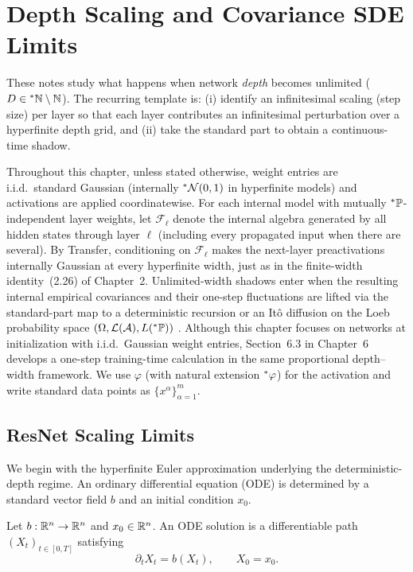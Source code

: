 \chapter{Depth Scaling and Covariance SDE Limits}\label{ch:depth}

These notes study what happens when network \emph{depth} becomes unlimited ($D \in {}^*\mathbb{N} \setminus \mathbb{N}$). The recurring template is: (i) identify an infinitesimal scaling (step size) per layer so that each layer contributes an infinitesimal perturbation over a hyperfinite depth grid, and (ii) take the standard part to obtain a continuous-time shadow.

Throughout this chapter, unless stated otherwise, weight entries are i.i.d.\ standard Gaussian (internally ${}^*\mathcal{N}(0,1)$ in hyperfinite models) and activations are applied coordinatewise. For each internal model with mutually ${}^*\mathbb{P}$-independent layer weights, let $\mathcal{F}_\ell$ denote the internal algebra generated by all hidden states through layer $\ell$ (including every propagated input when there are several). By Transfer, conditioning on $\mathcal{F}_\ell$ makes the next-layer preactivations internally Gaussian at every hyperfinite width, just as in the finite-width identity~(2.26) of Chapter~2. Unlimited-width shadows enter when the resulting internal empirical covariances and their one-step fluctuations are lifted via the standard-part map to a deterministic recursion or an It\^o diffusion on the Loeb probability space $(\Omega, \mathcal{L}(\mathcal{A}), L({}^*\mathbb{P}))$ \cite{loeb1975conversion,anderson1976nonstandard,keisler1984infinitesimal}. Although this chapter focuses on networks at initialization with i.i.d.\ Gaussian weight entries, Section~6.3 in Chapter~6 develops a one-step training-time calculation in the same proportional depth--width framework. We use $\varphi$ (with natural extension ${}^*\varphi$) for the activation and write standard data points as $\{x^\alpha\}_{\alpha=1}^m$.

\section{ResNet Scaling Limits}\label{sec:resnet_scaling}

We begin with the hyperfinite Euler approximation underlying the deterministic-depth regime. An ordinary differential equation (ODE) is determined by a standard vector field $b$ and an initial condition $x_0$.

\begin{definition}\label{def:ode_flow}
Let $b : \mathbb{R}^n \to \mathbb{R}^n$ and $x_0 \in \mathbb{R}^n$. An ODE solution is a differentiable path $(X_t)_{t \in [0,T]}$ satisfying
\begin{equation}\label{eq:ode_flow}
\partial_t X_t = b(X_t), \qquad X_0 = x_0.
\end{equation}
\end{definition}

